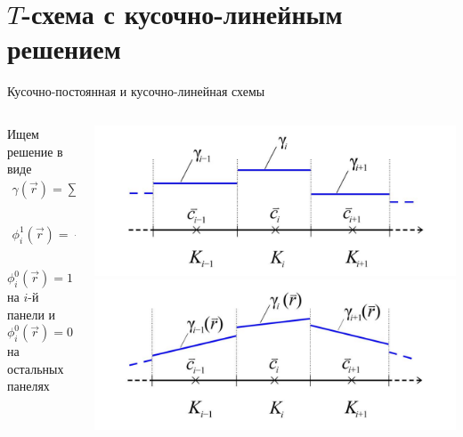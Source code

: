 \documentclass[ignoreonframetext,unicode]{beamer}
\begin{document}
\section{$T$-схема с кусочно-линейным решением}
\begin{frame}{Кусочно-постоянная и кусочно-линейная схемы}
	\begin{columns}
		\begin{column}{0.5\textwidth}
			\begin{block}{}
			Ищем решение в виде\vspace*{-3.0mm}
			\begin{gather*}
				\gamma(\vec r) = \sum_{i=1}^n \bigl(\gamma_i^0 \varphi_i^0(\vec r) + \gamma_i^1 \varphi_i^1(\vec r)\bigr),\\
				\phi_i^1(\vec r) =
				\begin{cases}
				\dfrac{(\vec r - \vec c_i) \cdot \vec \tau_i} {L_i}, & \vec r \in K_i,\\
				0, & \vec r \notin  K_i.
				\end{cases}
			\end{gather*}
			$\phi_i^0(\vec r) = 1$ на $i$-й панели и $\phi_i^0(\vec r) = 0$ на остальных панелях
			\end{block}
			\end{column}
		\begin{column}{0.55\textwidth}
			\includegraphics[width=1.1\textwidth]{basis0}
			\includegraphics[width=1.1\textwidth]{basis1}

\end{column}
\end{columns}
\end{frame}
\end{document}

